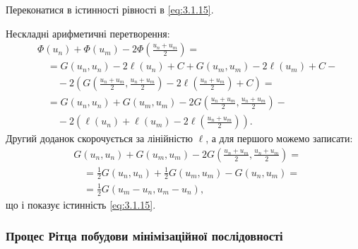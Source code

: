 \begin{exercise}
    Переконатися в істинності рівності в \eqref{eq:3.1.15}.
\end{exercise}
\begin{solution}
    Нескладні арифметичні перетворення:
    \begin{equation*}
        \begin{aligned}
            & \Phi(u_n) + \Phi(u_m) - 2 \Phi \left( \frac{u_n + u_m}{2} \right) = \\
            &\quad = G(u_n, u_n) - 2 \ell(u_n) + C + G(u_m, u_m) - 2 \ell(u_m) + C - \\
            &\qquad - 2 \left( G \left( \frac{u_n + u_m}{2}, \frac{u_n + u_m}{2} \right) - 2 \ell \left(\frac{u_n + u_m}{2} \right) + C \right) = \\
            &\quad = G(u_n, u_n) + G(u_m, u_m) - 2 G \left( \frac{u_n + u_m}{2}, \frac{u_n + u_m}{2} \right) - \\
            &\qquad - 2 \left( \ell(u_n) + \ell(u_m) - 2\ell\left(\frac{u_n + u_m}{2} \right) \right).
        \end{aligned}
    \end{equation*}
    Другий доданок скорочується за лінійністю $\ell$, а для першого можемо записати:
    \begin{equation*}
        \begin{aligned}
            & G(u_n, u_n) + G(u_m, u_m) - 2 G \left( \frac{u_n + u_m}{2}, \frac{u_n + u_m}{2} \right) = \\
            &\quad = \frac{1}{2} G(u_n, u_n) + \frac{1}{2} G(u_m, u_m) - G(u_n, u_m) = \\
            &\quad = \frac{1}{2} G(u_m - u_n, u_m - u_n),
        \end{aligned}
    \end{equation*}
    що і показує істинність \eqref{eq:3.1.15}.
\end{solution}

\subsubsection{Процес Рітца побудови мінімізаційної послідовності}

